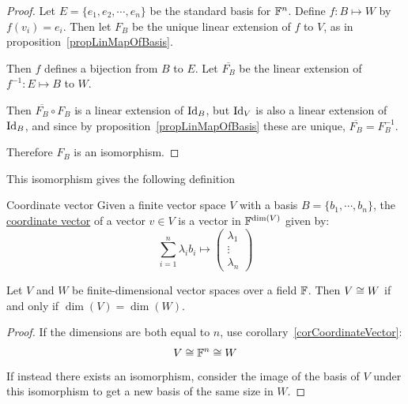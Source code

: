 \documentclass[../Main.tex]{subfiles}
\begin{document}
\begin{proof}
    Let $E = \{e_1, e_2, \cdots, e_n\}$ be the standard basis for $\mathbb{F}^n$. Define $f : B \mapsto W$ by $f(v_i) = e_i$. Then let $F_B$ be the unique linear extension of $f$ to $V$, as in proposition~\ref{propLinMapOfBasis}.

    Then $f$ defines a bijection from $B$ to $E$. Let $\overline{F_B}$ be the linear extension of $f^{-1} : E \mapsto B$ to $W$.

    Then $\overline{F_B} \circ F_B$ is a linear extension of $\operatorname{Id}_B$, but $\operatorname{Id}_V$ is also a linear extension of $\operatorname{Id}_B$, and since by proposition~\ref{propLinMapOfBasis} these are unique, $\overline{F_B} = F_B^{-1}$.

    Therefore $F_B$ is an isomorphism.
\end{proof}
This isomorphism gives the following definition
\begin{definition}{Coordinate vector}
    Given a finite vector space $V$ with a basis $B = \{b_1, \cdots, b_n\}$, the\\\underline{coordinate vector} of a vector $v \in V$ is a vector in $\mathbb{F}^{\dim(V)}$ given by:
    \begin{equation*}
        \sum_{i=1}^n \lambda_i b_i \mapsto \begin{pmatrix} \lambda_1 \\ \vdots \\ \lambda_n \end{pmatrix}
    \end{equation*}
\end{definition}
\begin{corollary}
    Let $V$ and $W$ be finite-dimensional vector spaces over a field $\mathbb{F}$. Then $V \cong W$ if and only if $\dim(V) = \dim(W)$.
    \label{corIsomIffSameDim}
\end{corollary}
\begin{proof}
    If the dimensions are both equal to $n$, use corollary~\ref{corCoordinateVector}:
    \begin{equation*}
        V \cong \mathbb{F}^n \cong W
    \end{equation*}
    If instead there exists an isomorphism, consider the image of the basis of $V$ under this isomorphism to get a new basis of the same size in $W$.
\end{proof}
\end{document}
